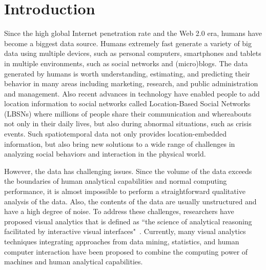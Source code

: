 %
%
%


\chapter{Introduction}

Since the high global Internet penetration rate and the Web 2.0 era, humans have become a biggest data source.
Humans extremely fast generate a variety of big data using multiple devices, such as personal computers, smartphones and tablets in multiple environments, such as social networks and (micro)blogs.
The data generated by humans is worth understanding, estimating, and predicting their behavior in many areas including marketing, research, and public administration and management.
Also recent advances in technology have enabled people to add location information to social networks called Location-Based Social Networks (LBSNs) where millions of people share their communication and whereabouts
not only in their daily lives, but also during abnormal situations, such as crisis events.
Such spatiotemporal data not only provides location-embedded information, but also bring new solutions to a wide range of challenges in analyzing social behaviors and interaction in the physical world.

However, the data has challenging issues.
Since the volume of the data exceeds the boundaries of human analytical capabilities and normal computing performance, it is almost impossible to perform a straightforward qualitative analysis of the data.
Also, the contents of the data are usually unstructured and have a high degree of noise.
To address these challenges, researchers have proposed visual analytics that is defined as ``the science of analytical reasoning facilitated by interactive visual interfaces"~\cite{Thomas:VA:2005}.
Currently, many visual analytics techniques integrating approaches from data mining, statistics, and human computer interaction have been proposed to combine the computing power of machines and human analytical capabilities.

